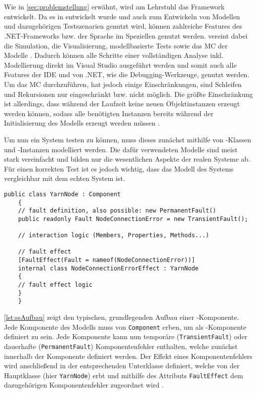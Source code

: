 \section{\sS}\label{sec:sSharp}

Wie in \autoref{sec:problemstellung} erwähnt, wird am Lehrstuhl das Framework \sS entwickelt. Da es in \cS entwickelt wurde und \cS auch zum Entwickeln von Modellen und dazugehörigen Testszenarien genutzt wird, können zahlreiche Features des .NET-Frameworks bzw. der Sprache \cS im Speziellen genutzt werden. \sS vereint dabei die Simulation, die Visualisierung, modellbasierte Tests sowie das MC der Modelle \cite{Habermaier2015,Habermaier2016}. Dadurch können alle Schritte einer vollständigen Analyse inkl. Modellierung direkt im Visual Studio ausgeführt werden und somit auch alle Features der IDE und von .NET, wie \zB die Debugging-Werkzeuge, genutzt werden. Um das MC durchzuführen, hat \sS jedoch einige Einschränkungen, \uA sind Schleifen und Rekursionen nur eingeschränkt bzw. nicht möglich. Die größte Einschränkung ist allerdings, dass während der Laufzeit keine neuen Objektinstanzen erzeugt werden können, sodass alle benötigten Instanzen bereits während der Initialisierung des Modells erzeugt werden müssen \cite{Habermaier2015}.

Um nun ein System testen zu können, muss dieses zunächst mithilfe von \cS-Klassen und -Instanzen modelliert werden. Die dafür verwendeten Modelle sind meist stark vereinfacht und bilden nur die wesentlichen Aspekte der realen Systeme ab. Für einen korrekten Test ist es jedoch wichtig, dass das Modell des Systems vergleichbar mit dem echten System ist.

\begin{minipage}{\linewidth}
	\begin{lstlisting}[frame=htrbl, caption={Grundlegender aufbau einer \sS-Komponente}, label={lst:ssAufbau}]
	public class YarnNode : Component
	{
	// fault definition, also possible: new PermanentFault()
	public readonly Fault NodeConnectionError = new TransientFault();
	
	// interaction logic (Members, Properties, Methods...)
	
	// fault effect
	[FaultEffect(Fault = nameof(NodeConnectionError))]
	internal class NodeConnectionErrorEffect : YarnNode
	{
	// fault effect logic
	}
	}
	\end{lstlisting}
\end{minipage}

\autoref{lst:ssAufbau} zeigt den typischen, grundlegenden Aufbau einer \sS-Komponente. Jede Komponente des Modells muss von \texttt{Component} erben, um als \sS-Komponente definiert zu sein. Jede Komponente kann nun temporäre (\texttt{TransientFault}) oder dauerhafte (\texttt{PermanentFault}) Komponentenfehler enthalten, welche zunächst innerhalb der Komponente definiert werden. Der Effekt eines Komponentenfehlers wird anschließend in der entsprechenden Unterklasse definiert, welche von der Hauptklasse (hier \texttt{YarnNode}) erbt und mithilfe des Attributs \texttt{FaultEffect} dem dazugehörigen Komponentenfehler zugeordnet wird \cite{Habermaier2016}.

